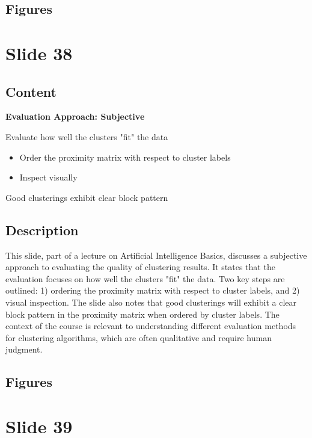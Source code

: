 \documentclass{article}%
\begin{document}
\subsection{Figures}%
\begin{figure}[H]%
\centering%
\end{figure}

%
\newpage%
\section{Slide 38}%
\label{sec:Slide38}%
\subsection{Content}%

\textbf{Evaluation Approach: Subjective}

Evaluate how well the clusters "fit" the data
\begin{itemize}
    \item Order the proximity matrix with respect to cluster labels
    \item Inspect visually
\end{itemize}
Good clusterings exhibit clear block pattern
%
\subsection{Description}%
This slide, part of a lecture on Artificial Intelligence Basics, discusses a subjective approach to evaluating the quality of clustering results.  It states that the evaluation focuses on how well the clusters "fit" the data.  Two key steps are outlined: 1) ordering the proximity matrix with respect to cluster labels, and 2) visual inspection.  The slide also notes that good clusterings will exhibit a clear block pattern in the proximity matrix when ordered by cluster labels.  The context of the course is relevant to understanding different evaluation methods for clustering algorithms, which are often qualitative and require human judgment.%
\subsection{Figures}%
\begin{figure}[H]%
\centering%
\end{figure}

%
\newpage%
\section{Slide 39}%
\label{sec:Slide39}%
\end{document}
